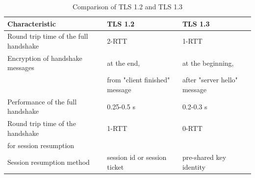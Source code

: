 \begin{table}[H]
	\centering
		\begin{tabular}{lll} \toprule
			\textbf{Characteristic} & \textbf{TLS 1.2} & \textbf{TLS 1.3} \\ \midrule
			Round trip time of the full handshake & 2-RTT & 1-RTT \\ \midrule
			Encryption of handshake messages& at the end, & at the beginning, \\ 
			& from "client finished" message & after "server hello" message \\ \midrule
			Performance of the full handshake & 0.25-0.5 s & 0.2-0.3 s\\ \midrule
			Round trip time of the handshake & 1-RTT & 0-RTT \\ 
			for session resumption \\ \midrule
			Session resumption method & session id or session ticket & pre-shared key identity \\ \midrule
		\end{tabular}
	\caption{Comparison of TLS 1.2 and TLS 1.3}
	\label{tab:comparison}
\end{table}

